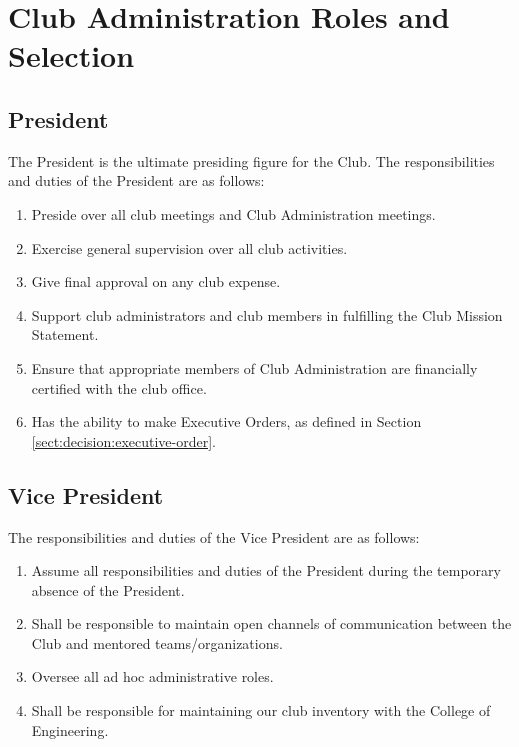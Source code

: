 \documentclass[english,11pt]{article}
\begin{document}
\section{Club Administration Roles and Selection} \label{act:cadmin}

\subsection{President} \label{sect:cadmin:president}
The President is the ultimate presiding figure for the Club.
The responsibilities and duties of the President are as follows:

\begin{enumerate}[label=\Alph*.]
    \item Preside over all club meetings and Club Administration meetings.
    \item Exercise general supervision over all club activities.
    \item Give final approval on any club expense.
    \item Support club administrators and club members in fulfilling the Club Mission Statement.
    \item Ensure that appropriate members of Club Administration are financially certified with the club office.
    \item Has the ability to make Executive Orders, as defined in Section \ref{sect:decision:executive-order}.
\end{enumerate}

\subsection{Vice President} \label{sect:cadmin:vicepresident}
The responsibilities and duties of the Vice President are as follows:

\begin{enumerate}[label=\Alph*.]	
    \item Assume all responsibilities and duties of the President during the temporary absence of the President.
    \item Shall be responsible to maintain open channels of communication between the Club and mentored teams/organizations.
    \item Oversee all ad hoc administrative roles.
    \item Shall be responsible for maintaining our club inventory with the College of Engineering.
\end{enumerate}
\end{document}
